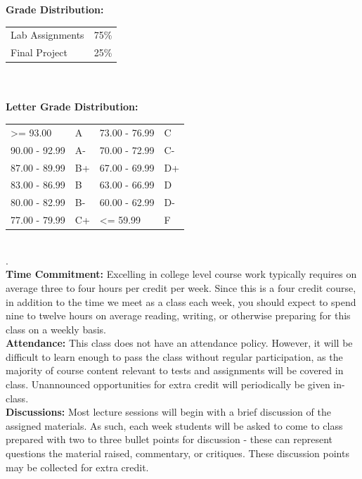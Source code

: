 \documentclass[11pt]{article}
\begin{document}
\textbf {\large Grade Distribution:} \\
\hspace*{40mm}
\begin{tabular}{ l l }
Lab Assignments & 75\% \\
Final Project  & 25\% \\
\end{tabular} \\\\

\textbf {\large Letter Grade Distribution:} \\
\hspace*{40mm}
\begin{tabular}{ l l | l l }
\textgreater= 93.00 & A & 73.00 - 76.99 & C \\
90.00 - 92.99 & A-  & 70.00 - 72.99 & C- \\
87.00 - 89.99 & B+  & 67.00 - 69.99 & D+ \\
83.00 - 86.99 & B  & 63.00 - 66.99 & D \\
80.00 - 82.99 & B-  & 60.00 - 62.99 & D- \\
77.00 - 79.99 & C+  & \textless= 59.99 & F \\
\end{tabular} \\
.\\
\textbf {\large Time Commitment:} Excelling in college level course work typically requires on average three to four hours per credit per week.  Since this is a four credit course, in addition to the time we meet as a class each week, you should expect to spend nine to twelve hours on average reading, writing, or otherwise preparing for this class on a weekly basis.\\

\textbf {\large Attendance:} This class does not have an attendance policy.  However, it will be difficult to learn enough to pass the class without regular participation, as the majority of course content relevant to tests and assignments will be covered in class.  Unannounced opportunities for extra credit will periodically be given in-class.\\

\textbf {\large Discussions:} Most lecture sessions will begin with a brief discussion of the assigned materials.  As such, each week students will be asked to come to class prepared with two to three bullet points for discussion - these can represent questions the material raised, commentary, or critiques.  These discussion points may be collected for extra credit.\\
\end{document}
